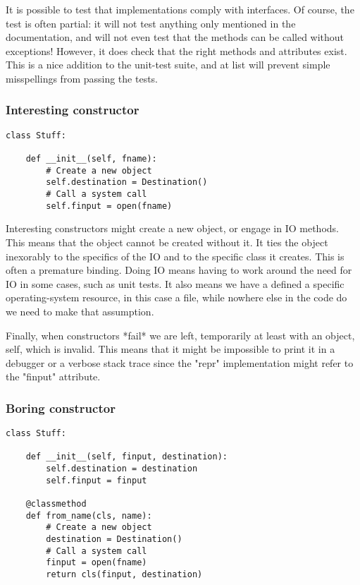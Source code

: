 It is possible to test that implementations comply with interfaces.
Of course,
the test is often partial:
it will not test anything only mentioned in the documentation,
and will not even test that the methods can be called without exceptions!
However,
it does check that the right methods and attributes exist.
This is a nice addition to the unit-test suite,
and at list will prevent simple misspellings from passing the tests.

\begin{frame}[fragile]
\frametitle{Interesting constructor}

\begin{lstlisting}
class Stuff:

    def __init__(self, fname):
        # Create a new object
        self.destination = Destination()
        # Call a system call
        self.finput = open(fname)
\end{lstlisting}

\end{frame}

Interesting constructors might create a new object,
or engage in IO methods.
This means that the object cannot be created without it.
It ties the object inexorably to the specifics of the IO
and to the specific class it creates.
This is often a premature binding.
Doing IO means having to work around the need for IO
in some cases,
such as unit tests.
It also means we have a defined a specific operating-system resource,
in this case a file,
while nowhere else in the code do we need to make that assumption.

Finally,
when constructors
*fail*
we are left,
temporarily at least with an object,
self,
which is invalid.
This means that it might be impossible to print it in a debugger
or a verbose stack trace since the "repr" implementation
might refer to the "finput" attribute.


\begin{frame}[fragile]
\frametitle{Boring constructor}

\begin{lstlisting}
class Stuff:

    def __init__(self, finput, destination):
        self.destination = destination
        self.finput = finput

    @classmethod
    def from_name(cls, name):
        # Create a new object
        destination = Destination()
        # Call a system call
        finput = open(fname)
        return cls(finput, destination)
\end{lstlisting}

\end{frame}

